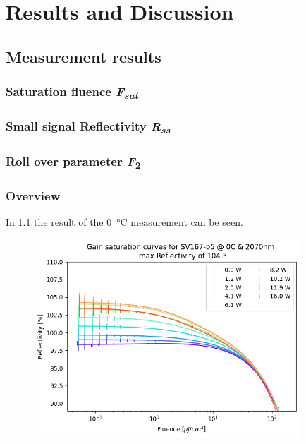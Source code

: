 \chapter{Results and Discussion}\label{chapter:results}

\section{Measurement results}

\subsection{Saturation fluence \textit{F\textsubscript{sat}}}
\newpage

\subsection{Small signal Reflectivity \textit{R\textsubscript{ss}}}

\subsection{Roll over parameter \textit{F}\textsubscript{2}}
\newpage

\subsection{Overview}

In \cref{fig:gainSV167} the result of the \qty{0}{\celsius} measurement can be seen. 

\begin{figure}
    \centering
    \includegraphics[width=10cm]{images/sv167-b5_0C.png}
    \caption{}
    \label{fig:gainSV167}
\end{figure}


